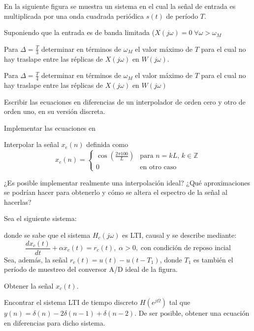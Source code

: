 \begin{ejercicio}
    En la siguiente figura se muestra un sistema en el cual la señal de entrada es multiplicada por una onda cuadrada periódica $s(t)$ de período $T$. 
    \begin{center}
    
    \end{center}
    Suponiendo que la entrada es de banda limitada ($X(j\omega)=0\; \forall \omega>\omega_M$
    
    \inciso Para $\Delta=\frac{T}{3}$ determinar en términos de $\omega_M$ el valor máximo de $T$ para el cual no hay traslape entre las réplicas de $X(j\omega)$ en $W(j\omega)$.
    
    \inciso Para $\Delta=\frac{T}{4}$ determinar en términos de $\omega_M$ el valor máximo de $T$ para el cual no hay traslape entre las réplicas de $X(j\omega)$ en $W(j\omega)$
\end{ejercicio}
    
\begin{ejercicio}
    Escribir las ecuaciones en diferencias de un interpolador de orden cero y otro de orden uno, en su versión discreta. 
    
    \inciso Implementar las ecuaciones en \Keyboardsym
    
    \inciso Interpolar la señal $x_e(n)$ definida como
    \begin{equation*}
        x_e(n) = \begin{cases}
        \cos(\frac{2\pi100}{L}) & \mbox{para $n=kL$, $k\in \mathbb{Z}$} \\
        0 & \mbox{en otro caso}
        \end{cases}
    \end{equation*}
    
    \inciso ¿Es posible implementar realmente una interpolación ideal? ¿Qué aproximaciones se podrían hacer para obtenerlo y cómo se altera el espectro de la señal al hacerlas?
\end{ejercicio}

\begin{ejercicio}
    Sea el siguiente sistema:
    \begin{center}
        
    \end{center}
    donde se sabe que el sistema $H_c(j\omega)$ es LTI, causal y se describe mediante:
    \begin{equation*}
        \frac{dx_c(t)}{dt} + \alpha x_c(t) = r_c(t), \; \alpha > 0,\; \mbox{con condición de reposo incial}
    \end{equation*}
    Sea, además, la señal $r_c(t) = u(t) - u(t-T_1)$, donde $T_1$ es también el período de muestreo del conversor A/D ideal de la figura.

    \inciso Obtener la señal $x_c(t)$.

    \inciso Encontrar el sistema LTI de tiempo discreto $H(e^{j\Omega})$ tal que $y(n) = \delta(n) - 2\delta(n-1) + \delta(n-2)$. De ser posible, obtener una ecuación en diferencias para dicho sistema.
\end{ejercicio}

